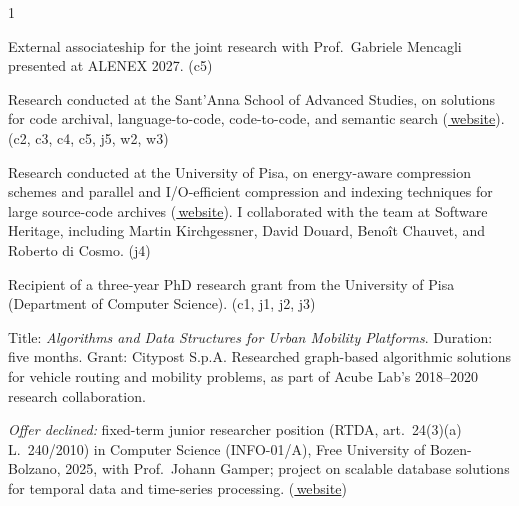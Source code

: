 \documentclass[10pt,a4paper,ragged2e,academicons]{altacv}
\newif\ifshortcv
\begin{document}
\begin{paracol}{1} %


External associateship for the joint research with Prof.~Gabriele Mencagli presented at ALENEX 2027. (c5)

\divider


Research conducted at the Sant'Anna School of Advanced Studies, on solutions for code archival, language-to-code, code-to-code, and semantic search (\href{https://www.santannapisa.it/it/assegni-di-ricerca-e-selezioni-incarichi-esterni/selezione-la-stipula-di-due-contratti-di-ricerca}{\faGlobe\,website}). (c2, c3, c4, c5, j5, w2, w3)

\divider


Research conducted at the University of Pisa, on energy-aware compression schemes and parallel and I/O-efficient compression and indexing techniques for large source-code archives (\href{https://bandi.unipi.it/public/Bandi/Detail/a1c63365-bf11-4ac7-ab06-55cc6cb7b038}{\faGlobe\,website}). I collaborated with the team at Software Heritage, including Martin Kirchgessner, David Douard, Benoît Chauvet, and Roberto di Cosmo. (j4)

\divider

Recipient of a three-year PhD research grant from the University of Pisa (Department of Computer Science). (c1, j1, j2, j3)

\divider

Title: \textit{Algorithms and Data Structures for Urban Mobility Platforms}. Duration: five months. Grant: Citypost S.p.A. Researched graph-based algorithmic solutions for vehicle routing and mobility problems, as part of Acube Lab's 2018–2020 research collaboration.

\ifshortcv\else%
\divider

{\small\textit{Offer declined:} fixed-term junior researcher position (RTDA, art.~24(3)(a) L.~240/2010) in Computer Science (INFO-01/A), Free University of Bozen-Bolzano, 2025, with Prof.~Johann Gamper; project on scalable database solutions for temporal data and time-series processing. (\href{https://www.unibz.it/it/home/position-calls/positions-for-academic-staff/7618-informatics-prof-gamper-johann?group=16}{\faGlobe\,website})\par}
\fi

\end{paracol}
\end{document}
